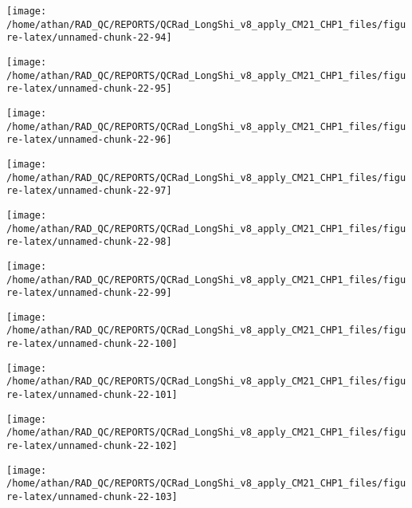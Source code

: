 \documentclass[
  10pt,
  a4paper,oneside]{article}
\begin{document}
\begin{center}\texttt{[image: /home/athan/RAD\_QC/REPORTS/QCRad\_LongShi\_v8\_apply\_CM21\_CHP1\_files/figure-latex/unnamed-chunk-22-94]} \end{center}

\begin{center}\texttt{[image: /home/athan/RAD\_QC/REPORTS/QCRad\_LongShi\_v8\_apply\_CM21\_CHP1\_files/figure-latex/unnamed-chunk-22-95]} \end{center}

\begin{center}\texttt{[image: /home/athan/RAD\_QC/REPORTS/QCRad\_LongShi\_v8\_apply\_CM21\_CHP1\_files/figure-latex/unnamed-chunk-22-96]} \end{center}

\begin{center}\texttt{[image: /home/athan/RAD\_QC/REPORTS/QCRad\_LongShi\_v8\_apply\_CM21\_CHP1\_files/figure-latex/unnamed-chunk-22-97]} \end{center}

\begin{center}\texttt{[image: /home/athan/RAD\_QC/REPORTS/QCRad\_LongShi\_v8\_apply\_CM21\_CHP1\_files/figure-latex/unnamed-chunk-22-98]} \end{center}

\begin{center}\texttt{[image: /home/athan/RAD\_QC/REPORTS/QCRad\_LongShi\_v8\_apply\_CM21\_CHP1\_files/figure-latex/unnamed-chunk-22-99]} \end{center}

\begin{center}\texttt{[image: /home/athan/RAD\_QC/REPORTS/QCRad\_LongShi\_v8\_apply\_CM21\_CHP1\_files/figure-latex/unnamed-chunk-22-100]} \end{center}

\begin{center}\texttt{[image: /home/athan/RAD\_QC/REPORTS/QCRad\_LongShi\_v8\_apply\_CM21\_CHP1\_files/figure-latex/unnamed-chunk-22-101]} \end{center}

\begin{center}\texttt{[image: /home/athan/RAD\_QC/REPORTS/QCRad\_LongShi\_v8\_apply\_CM21\_CHP1\_files/figure-latex/unnamed-chunk-22-102]} \end{center}

\begin{center}\texttt{[image: /home/athan/RAD\_QC/REPORTS/QCRad\_LongShi\_v8\_apply\_CM21\_CHP1\_files/figure-latex/unnamed-chunk-22-103]} \end{center}
\end{document}
